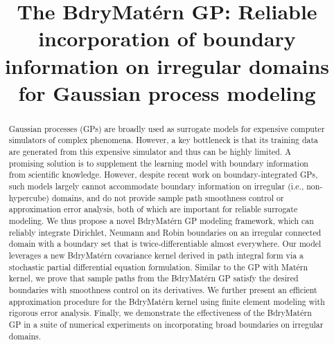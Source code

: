 \documentclass[aos,preprint]{imsart}
\theoremstyle{plain}
\theoremstyle{remark}
\begin{document}
\begin{frontmatter}
\title{The BdryMat\'ern GP: Reliable incorporation of boundary information on irregular domains for Gaussian process modeling}


\begin{abstract}
Gaussian processes (GPs) are broadly used as surrogate models for expensive computer simulators of complex phenomena. However, a key bottleneck is that its training data are generated from this expensive simulator and thus can be highly limited. A promising solution is to supplement the learning model with boundary information from scientific knowledge. However, despite recent work on boundary-integrated GPs, such models largely cannot accommodate boundary information on irregular (i.e., non-hypercube) domains, and do not provide sample path smoothness control or approximation error analysis, both of which are important for reliable surrogate modeling. We thus propose a novel BdryMat\'ern GP modeling framework, which can reliably integrate Dirichlet, Neumann and Robin boundaries on an irregular connected domain with a boundary set that is twice-differentiable almost everywhere. Our model leverages a new BdryMat\'ern covariance kernel derived in path integral form via a stochastic partial differential equation formulation. Similar to the GP with Mat\'ern kernel, we prove that sample paths from the BdryMat\'ern GP satisfy the desired boundaries with smoothness control on its derivatives. We further present an efficient approximation procedure for the BdryMat\'ern kernel using finite element modeling with rigorous error analysis. Finally, we demonstrate the effectiveness of the BdryMat\'ern GP in a suite of numerical experiments on incorporating broad boundaries on irregular domains.


\end{abstract}
\end{frontmatter}
\end{document}

